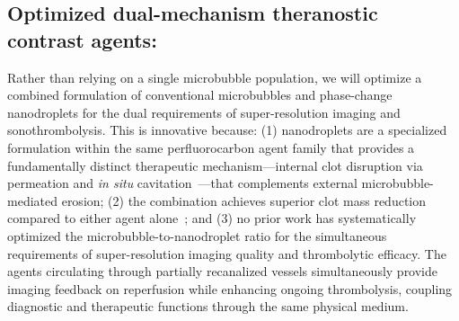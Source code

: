 \subsection{Optimized dual-mechanism theranostic contrast agents:} Rather than relying on a single microbubble population, we will optimize a combined formulation of conventional microbubbles and phase-change nanodroplets for the dual requirements of super-resolution imaging and sonothrombolysis. This is innovative because: (1) nanodroplets are a specialized formulation within the same perfluorocarbon agent family that provides a fundamentally distinct therapeutic mechanism---internal clot disruption via permeation and \textit{in situ} cavitation~\cite{kim2020comparison,goel2021nanodroplet}---that complements external microbubble-mediated erosion; (2) the combination achieves superior clot mass reduction compared to either agent alone~\cite{kim2022analysis}; and (3) no prior work has systematically optimized the microbubble-to-nanodroplet ratio for the simultaneous requirements of super-resolution imaging quality and thrombolytic efficacy. The agents circulating through partially recanalized vessels simultaneously provide imaging feedback on reperfusion while enhancing ongoing thrombolysis, coupling diagnostic and therapeutic functions through the same physical medium.
